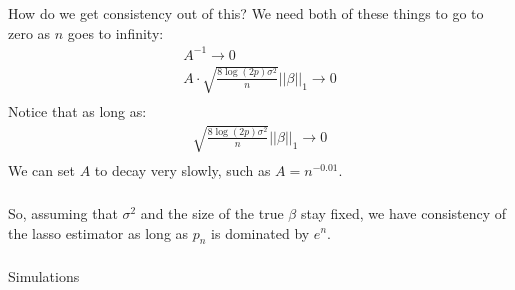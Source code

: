 \begin{frame}[fragile] \frametitle{}

How do we get consistency out of this? We need both of these things to
go to zero as $n$ goes to infinity:
\begin{align*}
A^{-1} \rightarrow 0 \\
A \cdot \sqrt{\frac{8 \log(2p) \sigma^2}{n}} || \beta ||_1 \rightarrow 0 \\
\end{align*}
\pause Notice that as long as:
\begin{align*}
\sqrt{\frac{8 \log(2p) \sigma^2}{n}} || \beta ||_1 \rightarrow 0 \\
\end{align*}
We can set $A$ to decay very slowly, such as $A = n^{-0.01}$.

\end{frame}

\begin{frame}[fragile] \frametitle{}

So, assuming that $\sigma^2$ and the size of the true $\beta$ stay fixed,
we have consistency of the lasso estimator as long as $p_n$ is dominated
by $e^n$.

\end{frame}


\begin{frame}[fragile] \frametitle{}

\begin{flushright}
{\color{yaleblue}\sc\fontsize{1cm}{0cm}\selectfont Simulations}
\end{flushright}

\end{frame}















